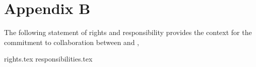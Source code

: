 \newpage
\section{Appendix B}
The following statement of rights and responsibility provides the context for
the commitment to collaboration between {\TeamName} and {\ClientName},
{\ClientOrganization}

{rights.tex}
{responsibilities.tex}